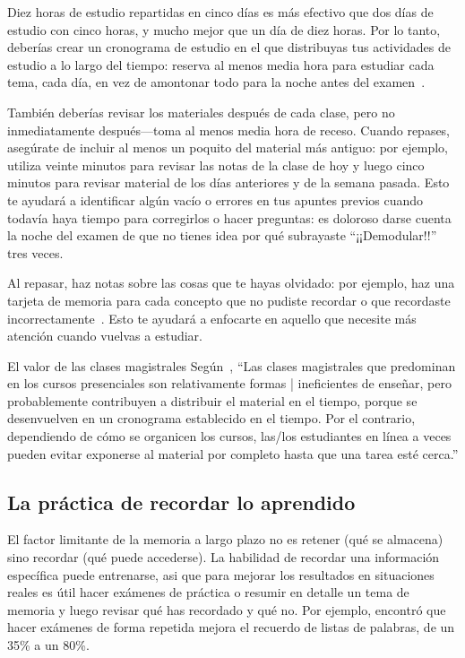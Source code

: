 Diez horas de estudio repartidas en cinco días
es más efectivo que dos días de estudio con cinco horas,
y mucho mejor que un día de diez horas.
Por lo tanto, deberías crear un cronograma de estudio en el que distribuyas tus actividades de estudio a lo largo del tiempo:
reserva al menos media hora para estudiar cada tema, cada día,
en vez de amontonar todo para la noche antes del examen~\cite{Kang2016}.

También deberías revisar los materiales después de cada clase,
pero no inmediatamente después---toma al menos media hora de receso.
Cuando repases,
asegúrate de incluir al menos un poquito del material más antiguo:
por ejemplo,
utiliza veinte minutos para revisar las notas de la clase de hoy
y luego cinco minutos para revisar material de los días anteriores
y de la semana pasada.
Esto te ayudará a identificar algún vacío o errores en tus apuntes previos
cuando todavía haya tiempo para corregirlos o hacer preguntas:
es doloroso darse cuenta la noche del examen
de que no tienes idea por qué subrayaste ``¡¡Demodular!!'' tres veces.

Al repasar,
haz notas sobre las cosas que te hayas olvidado:
por ejemplo,
haz una tarjeta de memoria para cada concepto que no pudiste recordar
o que recordaste incorrectamente~\cite{Matt2019}.
Esto te ayudará a enfocarte en aquello que necesite más atención cuando vuelvas a estudiar.

\begin{aside}{El valor de las clases magistrales}
  Según~\cite{Mill2016a},
  ``Las clases magistrales que predominan en los cursos presenciales son relativamente formas     |   ineficientes de enseñar,
  pero probablemente contribuyen a distribuir el material en el tiempo,
  porque se desenvuelven en un cronograma establecido en el tiempo.
  Por el contrario,
  dependiendo de cómo se organicen los cursos,
  las/los estudiantes en línea a veces pueden evitar exponerse al material por completo hasta que una     tarea esté cerca.''
\end{aside}

\subsection*{La práctica de recordar lo aprendido}

El factor limitante de la memoria a largo plazo no es retener (qué se almacena)
sino recordar (qué puede accederse).
La habilidad de recordar una información específica puede entrenarse,
asi que para mejorar los resultados en situaciones reales
es útil hacer exámenes de práctica o resumir en detalle un tema de memoria
y luego revisar qué has recordado y qué no.
Por ejemplo,
\cite{Karp2008} encontró que hacer exámenes de forma repetida mejora el recuerdo de listas de palabras, de un 35\% a un 80\%.

